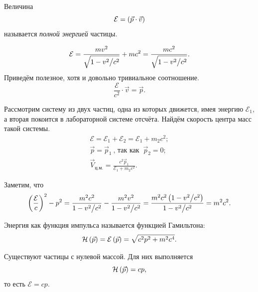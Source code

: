     \begin{Def} Величина
        \[
            \mathcal{E} = \left({\vec{p}\cdot\vec{v}}\right)
        \]
        называется \textit{полной энергией} частицы.
    \end{Def}
    \[
        \mathcal{E} = \frac{mv^2}{\sqrt{1 - v^2 \big/ c^2}} + mc^2 = \frac{mc^2}{\sqrt{1 - v^2 \big/ c^2}}.
    \]
    Приведём полезное, хотя и довольно тривиальное соотношение.
    \[
        \boxed{\frac{\mathcal{E}}{c^2} \cdot \vec{v} = \vec{p}}.
    \]
    \begin{example}
        Рассмотрим систему из двух частиц, одна из которых движется, имея энергию $\mathcal{E}_1$,
        а вторая покоится в лабораторной системе отсчёта. Найдём скорость центра масс такой системы.
        \begin{gather*}
            \mathcal{E} =\mathcal{E}_1 + \mathcal{E}_2 = \mathcal{E}_1 + m_2c^2;\\
            \vec{p} = \vec{p}_1 \ \textrm{,  так как  }\ \vec{p}_2 = 0;\\
            \vec{V}_{\textrm{ц.м.}} = \frac{c^2\vec{p}_1}{\mathcal{E}_1 + m_2c^2}.
        \end{gather*}
    \end{example}

    Заметим, что
    \[
        \left({\frac{\mathcal{E}}{c}}\right)^2 - p^2 = \frac{m^2c^2}{1 - v^2 \big/ c^2} - \frac{m^2v^2}{1 - v^2 \big/ c^2}
        = \frac{m^2c^2\left({1 - v^2 \big/ c^2}\right)}{1 - v^2 \big/ c^2} = m^2c^2.
    \]
    \begin{Def}
        Энергия как функция импульса называется функцией Гамильтона:
        \[
            \mathcal{H}\left({\vec{p}}\right) = \mathcal{E}\left({\vec{p}}\right) = \sqrt{c^2p^2 + m^2c^4}.
        \]
    \end{Def}
    Существуют частицы с нулевой массой. Для них выполняется
    \[
        \mathcal{H}\left({\vec{p}}\right) = cp,
    \]
    то есть $\mathcal{E} = cp$.

